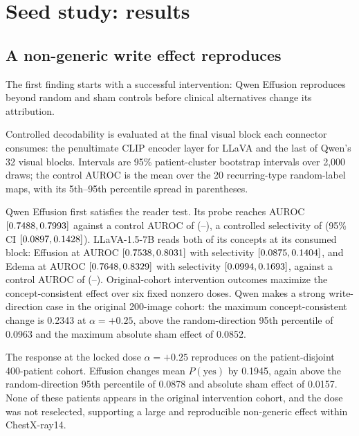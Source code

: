 \section{Seed study: results}
\label{app:seed-results}



\subsection{A non-generic write effect reproduces}
\label{sec:qwen-replication}

The first finding starts with a successful intervention: Qwen Effusion reproduces beyond random and sham controls before clinical alternatives change its attribution.

Controlled decodability is evaluated at the final visual block each connector consumes: the penultimate CLIP encoder layer for LLaVA and the last of Qwen's 32 visual blocks. Intervals are 95\% patient-cluster bootstrap intervals over 2,000 draws; the control AUROC is the mean over the 20 recurring-type random-label maps, with its 5th--95th percentile spread in parentheses.

Qwen Effusion first satisfies the reader test. Its probe reaches AUROC \cfSeedDecQwenEffAuroc{} $[0.7488,0.7993]$ against a control AUROC of \cfSeedDecQwenEffCtrl{} (\cfSeedDecQwenEffCtrlLo--\cfSeedDecQwenEffCtrlHi), a controlled selectivity of \cfSeedDecQwenEffSel{} (95\% CI $[0.0897,0.1428]$). LLaVA-1.5-7B reads both of its concepts at its consumed block: Effusion at AUROC \cfSeedDecLlavaEffAuroc{} $[0.7538,0.8031]$ with selectivity \cfSeedDecLlavaEffSel{} $[0.0875,0.1404]$, and Edema at AUROC \cfSeedDecLlavaEdemaAuroc{} $[0.7648,0.8329]$ with selectivity \cfSeedDecLlavaEdemaSel{} $[0.0994,0.1693]$, against a control AUROC of \cfSeedDecLlavaEffCtrl{} (\cfSeedDecLlavaEffCtrlLo--\cfSeedDecLlavaEffCtrlHi). Original-cohort intervention outcomes maximize the concept-consistent effect over six fixed nonzero doses. Qwen makes a strong write-direction case in the original 200-image cohort: the maximum concept-consistent change is 0.2343 at $\alpha=+0.25$, above the random-direction 95th percentile of 0.0963 and the maximum absolute sham effect of 0.0852.

The response at the locked dose $\alpha=+0.25$ reproduces on the patient-disjoint 400-patient cohort. Effusion changes mean $P(\mathrm{yes})$ by 0.1945, again above the random-direction 95th percentile of 0.0878 and absolute sham effect of 0.0157. None of these patients appears in the original intervention cohort, and the dose was not reselected, supporting a large and reproducible non-generic effect within ChestX-ray14.


